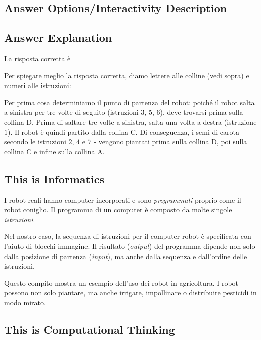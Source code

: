 \documentclass[a4paper,11pt]{report}
\newcommand{\taskGraphicsFolder}{..}
\begin{document}
\subsection*{Answer Options/Interactivity Description}



\endgroup

\subsection*{Answer Explanation}

La risposta corretta è \raisebox{-0.5ex}{}

Per spiegare meglio la risposta corretta, diamo lettere alle colline (vedi sopra) e numeri alle istruzioni:

{\centering%
\par}

Per prima cosa determiniamo il punto di partenza del robot: poiché il robot salta a sinistra per tre volte di seguito (istruzioni $3$, $5$, $6$), deve trovarsi prima sulla collina D. Prima di saltare tre volte a sinistra, salta una volta a destra (istruzione $1$). Il robot è quindi partito dalla collina C.
Di conseguenza, i semi di carota - secondo le istruzioni $2$, $4$ e $7$ - vengono piantati prima sulla collina D, poi sulla collina C e infine sulla collina A.


\subsection*{This is Informatics}

I robot reali hanno computer incorporati e sono \emph{programmati} proprio come il robot coniglio. Il programma di un computer è composto da molte singole \emph{istruzioni}.

Nel nostro caso, la sequenza di istruzioni per il computer robot è specificata con l’aiuto di blocchi immagine. Il risultato (\emph{output}) del programma dipende non solo dalla posizione di partenza (\emph{input}), ma anche dalla sequenza e dall’ordine delle istruzioni.

Questo compito mostra un esempio dell’uso dei robot in agricoltura. I robot possono non solo piantare, ma anche irrigare, impollinare o distribuire pesticidi in modo mirato.


\subsection*{This is Computational Thinking}
\end{document}
